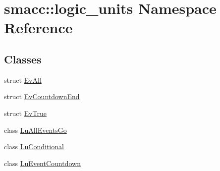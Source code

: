 \hypertarget{namespacesmacc_1_1logic__units}{}\section{smacc\+:\+:logic\+\_\+units Namespace Reference}
\label{namespacesmacc_1_1logic__units}
\subsection*{Classes}
\begin{DoxyCompactItemize}
\item 
struct \hyperlink{structsmacc_1_1logic__units_1_1EvAll}{Ev\+All}
\item 
struct \hyperlink{structsmacc_1_1logic__units_1_1EvCountdownEnd}{Ev\+Countdown\+End}
\item 
struct \hyperlink{structsmacc_1_1logic__units_1_1EvTrue}{Ev\+True}
\item 
class \hyperlink{classsmacc_1_1logic__units_1_1LuAllEventsGo}{Lu\+All\+Events\+Go}
\item 
class \hyperlink{classsmacc_1_1logic__units_1_1LuConditional}{Lu\+Conditional}
\item 
class \hyperlink{classsmacc_1_1logic__units_1_1LuEventCountdown}{Lu\+Event\+Countdown}
\end{DoxyCompactItemize}
